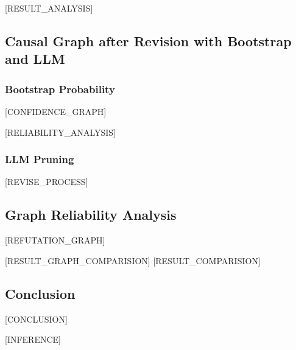 \documentclass{article}
\begin{document}
[RESULT_ANALYSIS]

\clearpage

\subsection{Causal Graph after Revision with Bootstrap and LLM}

\subsubsection{Bootstrap Probability}
[CONFIDENCE_GRAPH]

[RELIABILITY_ANALYSIS]

\subsubsection{LLM Pruning}

[REVISE_PROCESS]


\subsection{Graph Reliability Analysis}

[REFUTATION_GRAPH]

[RESULT_GRAPH_COMPARISION]
[RESULT_COMPARISION]

\subsection{Conclusion}
[CONCLUSION]

[INFERENCE]
\end{document}
